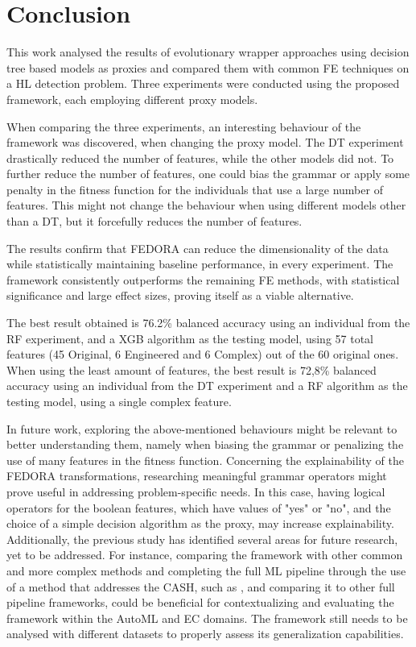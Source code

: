 \section{Conclusion}

This work analysed the results of evolutionary wrapper approaches using decision tree based models as proxies and compared them with common \gls{FE} techniques on a \gls{HL} detection problem. Three experiments were conducted using the proposed framework, each employing different proxy models.

When comparing the three experiments, an interesting behaviour of the framework was discovered, when changing the proxy model. The \gls{DT} experiment drastically reduced the number of features, while the other models did not. To further reduce the number of features, one could bias the grammar or apply some penalty in the fitness function for the individuals that use a large number of features. This might not change the behaviour when using different models other than a \gls{DT}, but it forcefully reduces the number of features.  

The results confirm that FEDORA can reduce the dimensionality of the data while statistically maintaining baseline performance, in every experiment. The framework consistently outperforms the remaining \gls{FE} methods, with statistical significance and large effect sizes, proving itself as a viable alternative.

The best result obtained is 76.2\% balanced accuracy using an individual from the \gls{RF} experiment, and a \gls{XGB} algorithm as the testing model, using 57 total features (45 Original, 6 Engineered and 6 Complex) out of the 60 original ones. When using the least amount of features, the best result is 72,8\% balanced accuracy using an individual from the \gls{DT} experiment and a \gls{RF} algorithm as the testing model, using a single complex feature.

In future work, exploring the above-mentioned behaviours might be relevant to better understanding them, namely when biasing the grammar or penalizing the use of many features in the fitness function. Concerning the explainability of the FEDORA transformations, researching meaningful grammar operators might prove useful in addressing problem-specific needs. In this case, having logical operators for the boolean features, which have values of "yes" or "no", and the choice of a simple decision algorithm as the proxy, may increase explainability. Additionally, the previous study has identified several areas for future research, yet to be addressed. For instance, comparing the framework with other common and more complex methods and completing the full \gls{ML} pipeline through the use of a method that addresses the \gls{CASH}, such as \cite{assunccao2020evolution}, and comparing it to other full pipeline frameworks, could be beneficial for contextualizing and evaluating the framework within the \gls{AutoML} and \gls{EC} domains. The framework still needs to be analysed with different datasets to properly assess its generalization capabilities.